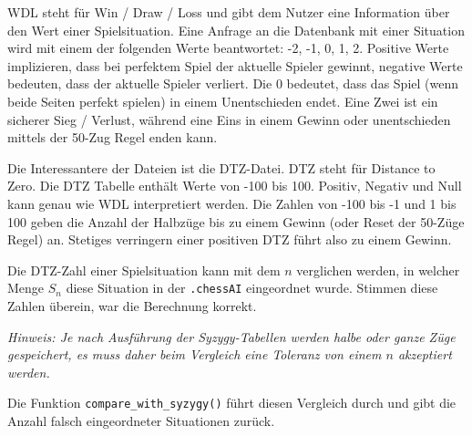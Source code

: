 \documentclass[12pt]{article}
\begin{document}
WDL steht für Win / Draw / Loss und gibt dem Nutzer eine Information
über den Wert einer Spielsituation. Eine Anfrage an die Datenbank mit
einer Situation wird mit einem der folgenden Werte beantwortet: -2, -1,
0, 1, 2. Positive Werte implizieren, dass bei perfektem Spiel der
aktuelle Spieler gewinnt, negative Werte bedeuten, dass der aktuelle
Spieler verliert. Die 0 bedeutet, dass das Spiel (wenn beide Seiten
perfekt spielen) in einem Unentschieden endet. Eine Zwei ist ein
sicherer Sieg / Verlust, während eine Eins in einem Gewinn oder
unentschieden mittels der 50-Zug Regel enden kann.

Die Interessantere der Dateien ist die DTZ-Datei. DTZ steht für Distance
to Zero. Die DTZ Tabelle enthält Werte von -100 bis 100. Positiv,
Negativ und Null kann genau wie WDL interpretiert werden. Die Zahlen von
-100 bis -1 und 1 bis 100 geben die Anzahl der Halbzüge bis zu einem
Gewinn (oder Reset der 50-Züge Regel) an. Stetiges verringern einer
positiven DTZ führt also zu einem Gewinn.

Die DTZ-Zahl einer Spielsituation kann mit dem \(n\) verglichen werden,
in welcher Menge \(S_n\) diese Situation in der \texttt{.chessAI}
eingeordnet wurde. Stimmen diese Zahlen überein, war die Berechnung
korrekt.

\emph{Hinweis: Je nach Ausführung der Syzygy-Tabellen werden halbe oder
ganze Züge gespeichert, es muss daher beim Vergleich eine Toleranz von
einem \(n\) akzeptiert werden.}

Die Funktion \texttt{compare\_with\_syzygy()} führt diesen Vergleich
durch und gibt die Anzahl falsch eingeordneter Situationen zurück.
\end{document}
